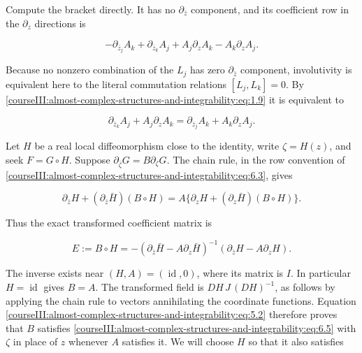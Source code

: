 Compute the bracket directly. It has no \(\partial_{\bar z}\) component, and its coefficient row in the \(\partial_z\) directions is

\begin{equation}
-\partial_{\bar z_j}A_k+\partial_{\bar z_k}A_j
+A_j\partial_z A_k-A_k\partial_z A_j.
\label{courseIII:almost-complex-structures-and-integrability:eq:6.4}
\end{equation}

Because no nonzero combination of the \(L_j\) has zero \(\partial_{\bar z}\) component, involutivity is equivalent here to the literal commutation relations \([L_j,L_k]=0\). By \eqref{courseIII:almost-complex-structures-and-integrability:eq:1.9} it is equivalent to

\begin{equation}
\partial_{\bar z_k}A_j+A_j\partial_z A_k
=\partial_{\bar z_j}A_k+A_k\partial_z A_j.
\label{courseIII:almost-complex-structures-and-integrability:eq:6.5}
\end{equation}

Let \(H\) be a real local diffeomorphism close to the identity, write \(\zeta=H(z)\), and seek \(F=G\circ H\). Suppose \(\partial_{\bar\zeta}G=B\partial_\zeta G\). The chain rule, in the row convention of \eqref{courseIII:almost-complex-structures-and-integrability:eq:6.3}, gives

\begin{equation}
\partial_{\bar z}H+(\partial_{\bar z}\bar H)(B\circ H)
=A\{\partial_z H+(\partial_z\bar H)(B\circ H)\}.
\label{courseIII:almost-complex-structures-and-integrability:eq:6.6}
\end{equation}

Thus the exact transformed coefficient matrix is

\begin{equation}
E:=B\circ H
=-(\partial_{\bar z}\bar H-A\partial_z\bar H)^{-1}
(\partial_{\bar z}H-A\partial_zH).
\label{courseIII:almost-complex-structures-and-integrability:eq:6.7}
\end{equation}

The inverse exists near \((H,A)=(\operatorname{id},0)\), where its matrix is \(I\). In particular \(H=\operatorname{id}\) gives \(B=A\). The transformed field is \(DH\,J\,(DH)^{-1}\), as follows by applying the chain rule to vectors annihilating the coordinate functions. Equation \eqref{courseIII:almost-complex-structures-and-integrability:eq:5.2} therefore proves that \(B\) satisfies \eqref{courseIII:almost-complex-structures-and-integrability:eq:6.5} with \(\zeta\) in place of \(z\) whenever \(A\) satisfies it. We will choose \(H\) so that it also satisfies

